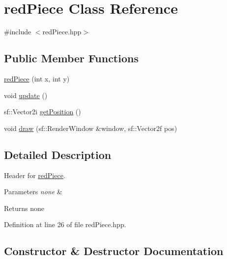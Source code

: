 \hypertarget{classred_piece}{}\section{red\+Piece Class Reference}
\label{classred_piece}


{\ttfamily \#include $<$red\+Piece.\+hpp$>$}

\subsection*{Public Member Functions}
\begin{DoxyCompactItemize}
\item 
\mbox{\hyperlink{classred_piece_aae46ee8100cc5bbb23aeae17196c159e}{red\+Piece}} (int x, int y)
\item 
void \mbox{\hyperlink{classred_piece_a90dbfbe8e12b0495e9ff01819b89b5d2}{update}} ()
\item 
sf\+::\+Vector2i \mbox{\hyperlink{classred_piece_a1a707e1a60df9654c3158f97eaf0a22b}{get\+Position}} ()
\item 
void \mbox{\hyperlink{classred_piece_ad8150c1fd0b92e8e5e2a1e6261a78db1}{draw}} (sf\+::\+Render\+Window \&window, sf\+::\+Vector2f pos)
\end{DoxyCompactItemize}


\subsection{Detailed Description}
Header for \mbox{\hyperlink{classred_piece}{red\+Piece}}.


\begin{DoxyParams}{Parameters}
{\em none} & \\
\hline
\end{DoxyParams}
\begin{DoxyReturn}{Returns}
none 
\end{DoxyReturn}


Definition at line 26 of file red\+Piece.\+hpp.



\subsection{Constructor \& Destructor Documentation}
\mbox{\label{classred_piece_aae46ee8100cc5bbb23aeae17196c159e}} 
